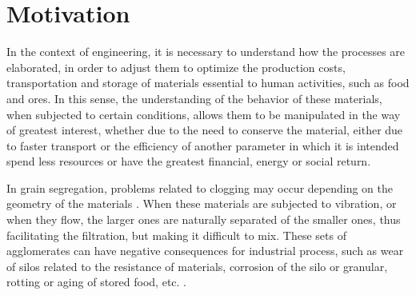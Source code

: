 \section{Motivation}
\label{sec:motivacao}


    In the context of engineering, it is necessary to understand how the processes are elaborated, in order to adjust them to optimize the production costs, transportation and storage of materials essential to human activities, such as food and ores. In this sense, the understanding of the behavior of these materials, when subjected to certain conditions, allows them to be manipulated in the way of greatest interest, whether due to the need to conserve the material, either due to faster transport or the efficiency of another parameter in which it is intended spend less resources or have the greatest financial, energy or social return.


    In grain segregation, problems related to clogging may occur depending on the geometry of the materials \cite{Caio-Tese}. When these materials are subjected to vibration, or when they flow, the larger ones are naturally separated of the smaller ones, thus facilitating the filtration, but making it difficult to mix. These sets of agglomerates can have negative consequences for industrial process, such as wear of silos related to the resistance of materials, corrosion of the silo or granular, rotting or aging of stored food, etc. \cite{Silo_failures}.

